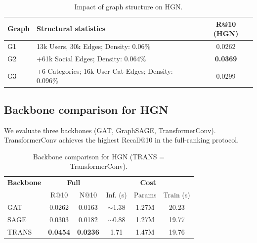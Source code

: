 \documentclass[11pt]{article}
\begin{document}
\begin{table}[!htbp]
    \centering
    \small
    \setlength{\tabcolsep}{3pt}
    \renewcommand{\arraystretch}{1.1}
    \begin{tabularx}{\linewidth}{l X c}
        \toprule
        \textbf{Graph} & \textbf{Structural statistics}                      & \textbf{R@10 (HGN)} \\
        \midrule
        G1             & 13k Users, 30k Edges; Density: 0.06\%               & 0.0262              \\
        G2             & +61k Social Edges; Density: 0.064\%                 & \textbf{0.0369}     \\
        G3             & +6 Categories; 16k User-Cat Edges; Density: 0.096\% & 0.0299              \\
        \bottomrule
    \end{tabularx}
    \caption{Impact of graph structure on HGN.}
    \label{tab:impact-graph}
\end{table}

\subsection{Backbone comparison for HGN}
We evaluate three backbones (GAT, GraphSAGE, TransformerConv). TransformerConv achieves the highest Recall@10 in the full-ranking protocol.

\begin{table}[!htbp]
    \centering
    \small
    \setlength{\tabcolsep}{3pt}
    \renewcommand{\arraystretch}{1.1}
    \begin{tabular}{l|cc|ccc}
        \toprule
        \textbf{Backbone} & \multicolumn{2}{c|}{\textbf{Full}} & \multicolumn{3}{c}{\textbf{Cost}}                                   \\
                          & R@10                               & N@10                              & Inf. (s)   & Params & Train (s) \\
        \midrule
        GAT               & 0.0262                             & 0.0163                            & $\sim$1.38 & 1.27M  & 20.23     \\
        SAGE              & 0.0303                             & 0.0182                            & $\sim$0.88 & 1.27M  & 19.77     \\
        TRANS             & \textbf{0.0454}                    & \textbf{0.0236}                   & 1.71       & 1.47M  & 19.76     \\
        \bottomrule
    \end{tabular}
    \caption{Backbone comparison for HGN (TRANS = TransformerConv).}
    \label{tab:backbone}
\end{table}
\end{document}
